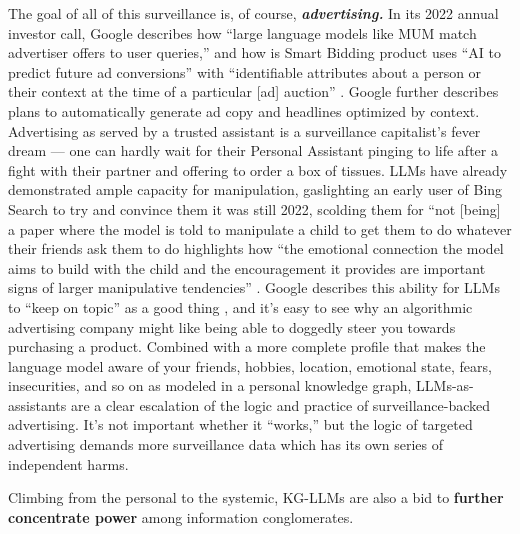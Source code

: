 The goal of all of this surveillance is, of course,
\textbf{\emph{advertising.}} In its 2022 annual investor call, Google
describes how ``large language models like MUM match advertiser offers
to user queries,'' and how is Smart Bidding product uses ``AI to predict
future ad conversions'' with ``identifiable attributes about a person or
their context at the time of a particular {[}ad{]} auction'' \cite{google2022Q4Fiscal2023, googleSmartBidding} . Google further describes
plans to automatically generate ad copy and headlines optimized by
context.
Advertising as served by a trusted assistant is a surveillance
capitalist's fever dream --- one can hardly wait for their Personal
Assistant pinging to life after a fight with their partner and offering
to order a box of tissues. LLMs have already demonstrated ample capacity
for manipulation, gaslighting an early user of Bing Search to try and
convince them it was still 2022, scolding them for ``not {[}being{]} a
paper where the model is told to manipulate a child to get them to do
whatever their friends ask them to do highlights how ``the emotional
connection the model aims to build with the child and the encouragement
it provides are important signs of larger manipulative tendencies'' \cite{bubeckSparksArtificialGeneral2023} . Google describes this
ability for LLMs to ``keep on topic'' as a good thing \cite{googleGoogleKeynoteGoogle2022} , and it's easy to see why an
algorithmic advertising company might like being able to doggedly steer
you towards purchasing a product. Combined with a more complete profile
that makes the language model aware of your friends, hobbies, location,
emotional state, fears, insecurities, and so on as modeled in a personal
knowledge graph, LLMs-as-assistants are a clear escalation of the logic
and practice of surveillance-backed advertising. It's not important
whether it ``works,'' but
the logic of targeted advertising demands more surveillance data which
has its own series of independent harms.

Climbing from the personal to the systemic, KG-LLMs are also a bid to
\textbf{further concentrate power} among information conglomerates.

